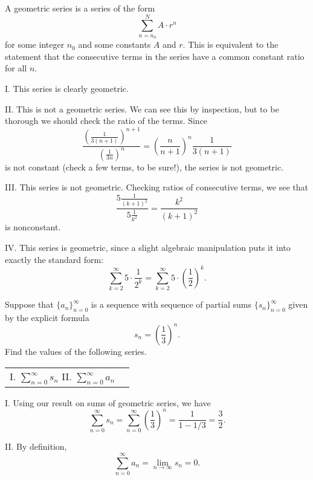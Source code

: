 \documentclass[]{ximera}
\begin{document}
\begin{freeResponse}
A geometric series is a series of the form
$$
\sum_{n=n_0}^N A \cdot r^n
$$
for some integer $n_0$ and some constants $A$ and $r$. This is equivalent to the statement that the consecutive terms in the series have a common constant ratio for all $n$. 

I. This series is clearly geometric.

II. This is not a geometric series. We can see this by inspection, but to be thorough we should check the ratio of the terms. Since
$$
\frac{\left(\frac{1}{3(n+1)}\right)^{n+1}}{\left(\frac{1}{3n}\right)^n} = \left(\frac{n}{n+1}\right)^n \frac{1}{3(n+1)}
$$
is not constant (check a few terms, to be sure!), the series is not geometric.

III. This series is not geometric. Checking ratios of consecutive terms, we see that
$$
\frac{5 \frac{1}{(k+1)^2}}{ 5 \frac{1}{k^2}} = \frac{k^2}{(k+1)^2}
$$
is nonconstant.

IV. This series is geometric, since a slight algebraic manipulation puts it into exactly the standard form:
$$
\sum_{k=2}^\infty 5 \cdot \frac{1}{2^k} = \sum_{k=2}^\infty 5 \cdot \left(\frac{1}{2}\right)^k.
$$
\end{freeResponse}

\begin{problem}
Suppose that $\{a_n\}_{n=0}^\infty$ is a sequence with sequence of partial sums $\{s_n\}_{n=0}^\infty$ given by the explicit formula
$$
s_n = \left(\frac{1}{3}\right)^n.
$$
Find the values of the following series.
\begin{center}
\begin{tabular}{ll}
I. $\sum_{n=0}^\infty s_n$ \hspace{.6in} II. $\sum_{n=0}^\infty a_n$
\end{tabular}
\end{center}
\end{problem}

\begin{freeResponse}
I. Using our result on sums of geometric series, we have
$$
\sum_{n=0}^\infty s_n = \sum_{n=0}^\infty \left(\frac{1}{3}\right)^n = \frac{1}{1-1/3} = \frac{3}{2}.
$$

II. By definition,
$$
\sum_{n=0}^\infty a_n = \lim_{n \rightarrow \infty} s_n = 0.
$$
\end{freeResponse}
\end{document}

